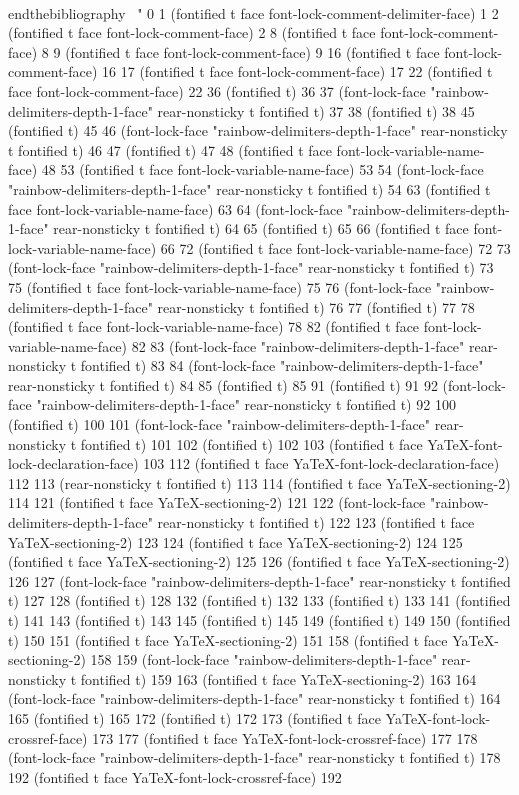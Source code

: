 {\\end{thebibliography}
\
" 0 1 (fontified t face font-lock-comment-delimiter-face) 1 2 (fontified t face font-lock-comment-face) 2 8 (fontified t face font-lock-comment-face) 8 9 (fontified t face font-lock-comment-face) 9 16 (fontified t face font-lock-comment-face) 16 17 (fontified t face font-lock-comment-face) 17 22 (fontified t face font-lock-comment-face) 22 36 (fontified t) 36 37 (font-lock-face "rainbow-delimiters-depth-1-face" rear-nonsticky t fontified t) 37 38 (fontified t) 38 45 (fontified t) 45 46 (font-lock-face "rainbow-delimiters-depth-1-face" rear-nonsticky t fontified t) 46 47 (fontified t) 47 48 (fontified t face font-lock-variable-name-face) 48 53 (fontified t face font-lock-variable-name-face) 53 54 (font-lock-face "rainbow-delimiters-depth-1-face" rear-nonsticky t fontified t) 54 63 (fontified t face font-lock-variable-name-face) 63 64 (font-lock-face "rainbow-delimiters-depth-1-face" rear-nonsticky t fontified t) 64 65 (fontified t) 65 66 (fontified t face font-lock-variable-name-face) 66 72 (fontified t face font-lock-variable-name-face) 72 73 (font-lock-face "rainbow-delimiters-depth-1-face" rear-nonsticky t fontified t) 73 75 (fontified t face font-lock-variable-name-face) 75 76 (font-lock-face "rainbow-delimiters-depth-1-face" rear-nonsticky t fontified t) 76 77 (fontified t) 77 78 (fontified t face font-lock-variable-name-face) 78 82 (fontified t face font-lock-variable-name-face) 82 83 (font-lock-face "rainbow-delimiters-depth-1-face" rear-nonsticky t fontified t) 83 84 (font-lock-face "rainbow-delimiters-depth-1-face" rear-nonsticky t fontified t) 84 85 (fontified t) 85 91 (fontified t) 91 92 (font-lock-face "rainbow-delimiters-depth-1-face" rear-nonsticky t fontified t) 92 100 (fontified t) 100 101 (font-lock-face "rainbow-delimiters-depth-1-face" rear-nonsticky t fontified t) 101 102 (fontified t) 102 103 (fontified t face YaTeX-font-lock-declaration-face) 103 112 (fontified t face YaTeX-font-lock-declaration-face) 112 113 (rear-nonsticky t fontified t) 113 114 (fontified t face YaTeX-sectioning-2) 114 121 (fontified t face YaTeX-sectioning-2) 121 122 (font-lock-face "rainbow-delimiters-depth-1-face" rear-nonsticky t fontified t) 122 123 (fontified t face YaTeX-sectioning-2) 123 124 (fontified t face YaTeX-sectioning-2) 124 125 (fontified t face YaTeX-sectioning-2) 125 126 (fontified t face YaTeX-sectioning-2) 126 127 (font-lock-face "rainbow-delimiters-depth-1-face" rear-nonsticky t fontified t) 127 128 (fontified t) 128 132 (fontified t) 132 133 (fontified t) 133 141 (fontified t) 141 143 (fontified t) 143 145 (fontified t) 145 149 (fontified t) 149 150 (fontified t) 150 151 (fontified t face YaTeX-sectioning-2) 151 158 (fontified t face YaTeX-sectioning-2) 158 159 (font-lock-face "rainbow-delimiters-depth-1-face" rear-nonsticky t fontified t) 159 163 (fontified t face YaTeX-sectioning-2) 163 164 (font-lock-face "rainbow-delimiters-depth-1-face" rear-nonsticky t fontified t) 164 165 (fontified t) 165 172 (fontified t) 172 173 (fontified t face YaTeX-font-lock-crossref-face) 173 177 (fontified t face YaTeX-font-lock-crossref-face) 177 178 (font-lock-face "rainbow-delimiters-depth-1-face" rear-nonsticky t fontified t) 178 192 (fontified t face YaTeX-font-lock-crossref-face) 192 }
